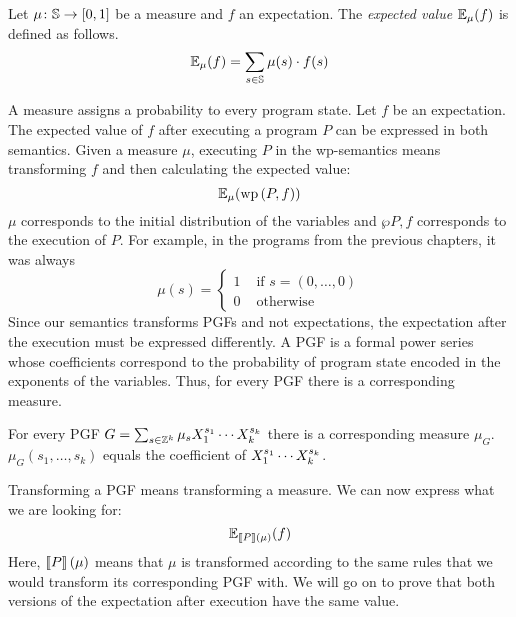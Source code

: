 \begin{definition}
	Let $\mu \colon \S \to [0, 1]$ be a measure and $f$ an expectation.
	The \emph{expected value} $\E_\mu(f)$ is defined as follows.
	\[ \E_\mu(f) = \sum_{s \in \S} \mu(s) \cdot f(s) \]
\end{definition}
A measure assigns a probability to every program state.
Let $f$ be an expectation.
The expected value of $f$ after executing a program $P$ can be expressed in both semantics.
Given a measure $\mu$, executing $P$ in the wp-semantics means transforming $f$ and then calculating the expected value:
\[ \E_\mu(\wp{P, f}) \]
$\mu$ corresponds to the initial distribution of the variables and $\wp{P, f}$ corresponds to the execution of $P$.
For example, in the programs from the previous chapters, it was always
\[ \mu(s) = \begin{cases}
	1 & \text{ if } s = (0, \ldots, 0) \\
	0 & \text{ otherwise}
\end{cases} \]
Since our semantics transforms PGFs and not expectations, the expectation after the execution must be expressed differently.
A PGF is a formal power series whose coefficients correspond to the probability of program state encoded in the exponents of the variables.
Thus, for every PGF there is a corresponding measure.
\begin{theorem}
	For every PGF $G = \sum_{s \in \Z^k} \mu_s \Xok$ there is a corresponding measure $\mu_G$.
	$\mu_G(s_1, \ldots, s_k)$ equals the coefficient of $\Xok$.
\end{theorem}
Transforming a PGF means transforming a measure.
We can now express what we are looking for:
\[ \E_{\smtx{P}(\mu)}(f) \]
Here, $\smtx{P}(\mu)$ means that $\mu$ is transformed according to the same rules that we would transform its corresponding PGF with.
We will go on to prove that both versions of the expectation after execution have the same value.

